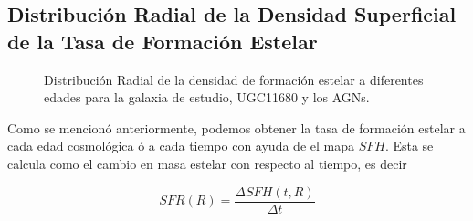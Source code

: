 \subsection{Distribución Radial de la Densidad Superficial de la Tasa de Formación Estelar}

\begin{figure}[htbp]
\centering
{}
\caption[Tasas De formación Estelar Radiales]{Distribución Radial de la densidad de formación estelar a diferentes edades para la galaxia de estudio, UGC11680  y los AGNs.}
\label{sfr}
\end{figure}


\noindent Como se mencionó anteriormente, podemos obtener la tasa de formación estelar a cada edad cosmológica ó a cada tiempo con ayuda de el mapa $SFH$. Esta se calcula como el cambio en masa estelar con respecto al tiempo, es decir

\begin{equation}
SFR(R)= \frac{\Delta SFH(t,R)}{\Delta t}
\end{equation}


